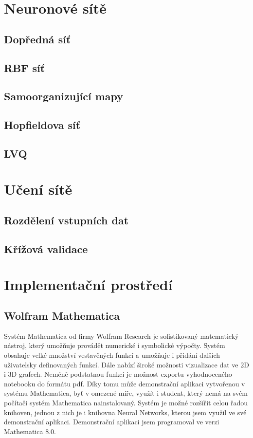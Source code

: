 \documentclass[11pt,twoside,a4paper]{book}
\begin{document}
\chapter{Neuronové sítě}
\section{Dopředná síť}
\section{RBF síť}
\section{Samoorganizující mapy}
\section{Hopfieldova síť}
\section{LVQ}
\chapter{Učení sítě}
\section{Rozdělení vstupních dat}
\section{Křížová validace}

\chapter{Implementační prostředí}
\section{Wolfram Mathematica}
Systém Mathematica od firmy Wolfram Research je sofistikovaný matematický nástroj, který umožňuje provádět numerické i symbolické výpočty. Systém obsahuje velké množství vestavěných funkcí a umožňuje i přidání dalších uživatelsky definovaných funkcí. Dále nabízí široké možnosti vizualizace dat ve 2D i 3D grafech. Neméně podstatnou funkcí je možnost exportu vyhodnoceného notebooku do formátu pdf. Díky tomu může demonstrační aplikaci vytvořenou v systému Mathematica, byť v omezené míře, využít i student, který nemá na svém počítači systém Mathematica nainstalovaný. Systém je možné rozšířit celou řadou knihoven, jednou z nich je i knihovna Neural Networks, kterou jsem využil ve své demonstrační aplikaci. Demonstrační aplikaci jsem programoval ve verzi Mathematica 8.0.
\end{document}

